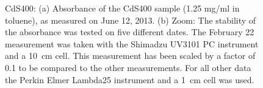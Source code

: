 \documentclass[cits]{JINST}
\begin{document}

\begin{figure}[tb]
\begin{center}
\caption[]{CdS400: (a) Absorbance of the CdS400 sample (1.25 mg/ml in toluene), as measured on June 12, 2013. (b) Zoom: The stability of the absorbance was tested on five different dates. The February 22 measurement was taken with the Shimadzu UV3101 PC instrument and a 10~cm cell. This measurement has been scaled by a factor of 0.1 to be compared to the other measurements. For all other data the Perkin Elmer Lambda25 instrument and a 1~cm cell was used. \label{cds400_stability}}
\end{center}
\end{figure}
\end{document}
